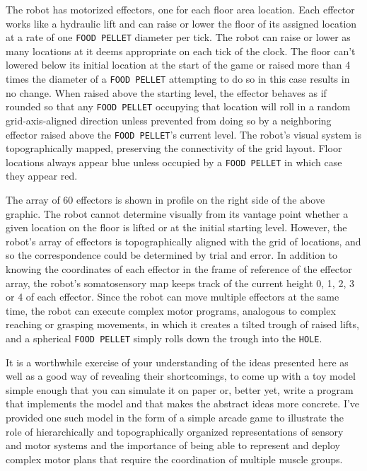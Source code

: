     The robot has {} motorized effectors, one for each floor area location. Each effector works like a hydraulic lift and can raise or lower the floor of its assigned location at a rate of one {\tt{FOOD PELLET}} diameter per tick. The robot can raise or lower as many locations at it deems appropriate on each tick of the clock. The floor can't lowered below its initial location at the start of the game or raised more than 4 times the diameter of a {\tt{FOOD PELLET}} {\emdash{}} attempting to do so in this case results in no change. When raised above the starting level, the effector behaves as if rounded so that  any {\tt{FOOD PELLET}} occupying that location will roll in a random grid-axis-aligned direction unless prevented from doing so by a neighboring effector raised above the {\tt{FOOD PELLET}}'s current level. The robot's visual system is topographically mapped, preserving the connectivity of the grid layout. Floor locations always appear blue unless occupied by a {\tt{FOOD PELLET}} in which case they appear red.

    The array of 60 effectors is shown in profile on the right side of the above graphic. The robot cannot determine visually from its vantage point whether a given location on the floor is lifted or at the initial starting level. However, the robot's array of effectors is topographically aligned with the grid of locations, and so the correspondence could be determined by trial and error. In addition to knowing the coordinates of each effector in the frame of reference of the effector array, the robot's somatosensory map keeps track of the current height {\emdash{}} 0, 1, 2, 3 or 4 {\emdash{}} of each effector. Since the robot can move multiple effectors at the same time, the robot can execute complex motor programs, analogous to complex reaching or grasping movements, in which it creates a tilted trough of raised lifts, and a spherical {\tt{FOOD PELLET}} simply rolls down the trough into the {\tt{HOLE}}.

It is a worthwhile exercise of your understanding of the ideas presented here {\emdash{}} as well as a good way of revealing their shortcomings, to come up with a toy model simple enough that you can simulate it on paper or, better yet, write a program that implements the model and that makes the abstract ideas more concrete. I've provided one such model in the form of a simple arcade game to illustrate the role of hierarchically and topographically organized representations of sensory and motor systems and the importance of being able to represent and deploy complex motor plans that require the coordination of multiple muscle groups. 

